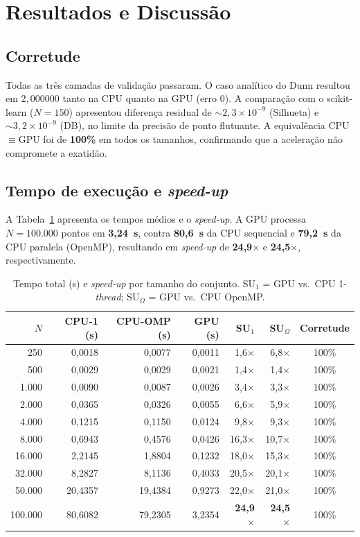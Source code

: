 \documentclass[12pt]{article}
\begin{document}
\section{Resultados e Discussão}

\subsection{Corretude}
Todas as três camadas de validação passaram. O caso analítico do Dunn
resultou em $2{,}000000$ tanto na CPU quanto na GPU (erro $0$). A comparação
com o scikit-learn ($N=150$) apresentou diferença residual de
$\sim\!2{,}3\times10^{-9}$ (Silhueta) e $\sim\!3{,}2\times10^{-9}$ (DB),
no limite da precisão de ponto flutuante. A equivalência CPU$\equiv$GPU foi
de \textbf{100\%} em todos os tamanhos, confirmando que a aceleração não
compromete a exatidão.

\subsection{Tempo de execução e \emph{speed-up}}
A Tabela~\ref{tab:resultados} apresenta os tempos médios e o \emph{speed-up}.
A GPU processa $N=100.000$ pontos em \textbf{3,24~s}, contra \textbf{80,6~s}
da CPU sequencial e \textbf{79,2~s} da CPU paralela (OpenMP), resultando em
\emph{speed-up} de \textbf{24,9$\times$} e \textbf{24,5$\times$},
respectivamente.

\begin{table}[ht]
\centering
\caption{Tempo total (s) e \emph{speed-up} por tamanho do conjunto.
SU$_1$ = GPU vs.\ CPU 1-\emph{thread}; SU$_\Omega$ = GPU vs.\ CPU OpenMP.}
\label{tab:resultados}
\begin{tabular}{rrrrrrc}
\toprule
$N$ & CPU-1 (s) & CPU-OMP (s) & GPU (s) & SU$_1$ & SU$_\Omega$ & Corretude \\
\midrule
250 & 0,0018 & 0,0077 & 0,0011 & 1,6$\times$ & 6,8$\times$ & 100\% \\
500 & 0,0029 & 0,0029 & 0,0021 & 1,4$\times$ & 1,4$\times$ & 100\% \\
1.000 & 0,0090 & 0,0087 & 0,0026 & 3,4$\times$ & 3,3$\times$ & 100\% \\
2.000 & 0,0365 & 0,0326 & 0,0055 & 6,6$\times$ & 5,9$\times$ & 100\% \\
4.000 & 0,1215 & 0,1150 & 0,0124 & 9,8$\times$ & 9,3$\times$ & 100\% \\
8.000 & 0,6943 & 0,4576 & 0,0426 & 16,3$\times$ & 10,7$\times$ & 100\% \\
16.000 & 2,2145 & 1,8804 & 0,1232 & 18,0$\times$ & 15,3$\times$ & 100\% \\
32.000 & 8,2827 & 8,1136 & 0,4033 & 20,5$\times$ & 20,1$\times$ & 100\% \\
50.000 & 20,4357 & 19,4384 & 0,9273 & 22,0$\times$ & 21,0$\times$ & 100\% \\
100.000 & 80,6082 & 79,2305 & 3,2354 & \textbf{24,9$\times$} & \textbf{24,5$\times$} & 100\% \\
\bottomrule
\end{tabular}
\end{table}
\end{document}
